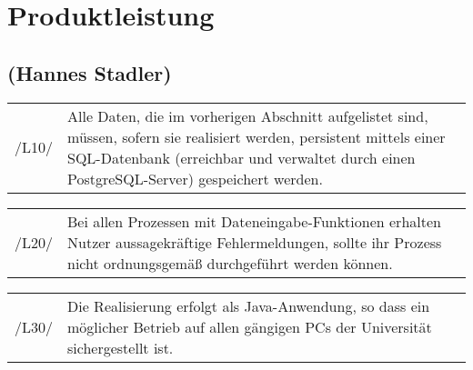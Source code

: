 \section{Produktleistung}
\label{sec:Produktleistung}
\subsection*{(Hannes Stadler)}

\begin{tabular}{p{1.5cm}p{14.5cm}}


	 /L10/	& Alle Daten, die im vorherigen Abschnitt aufgelistet sind, müssen, sofern sie realisiert werden, persistent mittels einer SQL-Datenbank (erreichbar und verwaltet durch einen PostgreSQL-Server) gespeichert werden. \\[0.25cm]
	 
\end{tabular}


\begin{tabular}{p{1.5cm}p{14.5cm}}
						
	 /L20/	& Bei allen Prozessen mit Dateneingabe-Funktionen erhalten Nutzer aussagekräftige Fehlermeldungen, sollte ihr Prozess nicht ordnungsgemäß durchgeführt werden können. \\[0.25cm]
	 
\end{tabular}


\begin{tabular}{p{1.5cm}p{14.5cm}}
						
	 /L30/	& Die Realisierung erfolgt als Java-Anwendung, so dass ein möglicher Betrieb auf allen gängigen PCs der Universität sichergestellt ist. \\[0.25cm]

\end{tabular}


